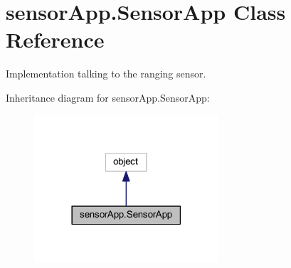 \hypertarget{classsensor_app_1_1_sensor_app}{}\section{sensor\+App.\+Sensor\+App Class Reference}
\label{classsensor_app_1_1_sensor_app}


Implementation talking to the ranging sensor.  




Inheritance diagram for sensor\+App.\+Sensor\+App\+:\nopagebreak
\begin{figure}[H]
\begin{center}
\leavevmode
\includegraphics[width=194pt]{classsensor_app_1_1_sensor_app__inherit__graph}
\end{center}
\end{figure}
